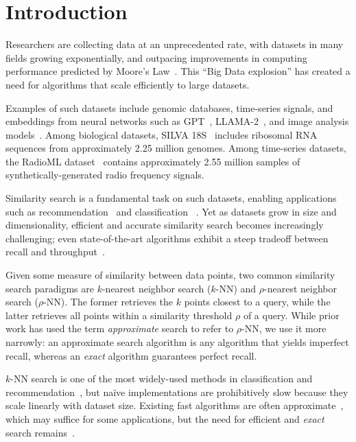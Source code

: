\section{Introduction}
\label{sec:introduction}

Researchers are collecting data at an unprecedented rate, with datasets in many fields growing exponentially, and outpacing improvements in computing performance predicted by Moore's Law~\cite{kahn2011future}.
This ``Big Data explosion'' has created a need for algorithms that scale efficiently to large datasets.

Examples of such datasets include genomic databases, time-series signals, and embeddings from neural networks such as GPT~\cite{2020arXiv200514165B, OpenAI2023GPT4TR}, LLAMA-2~\cite{Touvron2023Llama2O}, and image analysis models~\cite{radford2021learning, dosovitskiy2020image}.
Among biological datasets, SILVA 18S~\cite{10.1093/nar/gks1219} includes ribosomal RNA sequences from approximately 2.25 million genomes.
Among time-series datasets, the RadioML dataset~\cite{oshea2018radioml} contains approximately 2.55 million samples of synthetically-generated radio frequency signals.

Similarity search is a fundamental task on such datasets, enabling applications such as recommendation~\cite{annoy} and classification ~\cite{suyanto2022knnclassifier}.
Yet as datasets grow in size and dimensionality, efficient and accurate similarity search becomes increasingly challenging;
even state-of-the-art algorithms exhibit a steep tradeoff between recall and throughput~\cite{malkov2016hnsw, johnson2019billion, annoy, aumuller2020ann}.

Given some measure of similarity between data points, two common similarity search paradigms are $k$-nearest neighbor search ($k$-NN) and $\rho$-nearest neighbor search ($\rho$-NN).
The former retrieves the $k$ points closest to a query, while the latter retrieves all points within a similarity threshold $\rho$ of a query.
While prior work has used the term \textit{approximate} search to refer to $\rho$-NN, we use it more narrowly: an {approximate} search algorithm is any algorithm that yields imperfect recall, whereas an \textit{exact} algorithm guarantees perfect recall.

$k$-NN search is one of the most widely-used methods in classification and recommendation~\cite{fix1952discriminatory, cover1967nearest}, but na\"{i}ve implementations are prohibitively slow because they scale linearly with dataset size.
Existing fast algorithms are often approximate~\cite{gao2023high}, which may suffice for some applications, but the need for efficient and \textit{exact} search remains~\cite{ukey2023survey}.


